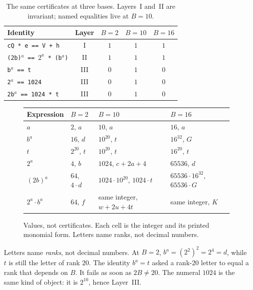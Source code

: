 \documentclass{article}
\theoremstyle{plain}
\theoremstyle{definition}
\theoremstyle{remark}
\begin{document}
\begin{table}[htbp]
\centering
\begin{tabular}{lcccc}
Identity & Layer & \(B=2\) & \(B=10\) & \(B=16\) \\
\hline
\texttt{cQ * e == V + h} & I & \(1\) & \(1\) & \(1\) \\
\texttt{(2b)$^a$ == $2^a$ * (b$^a$)} & II & \(1\) & \(1\) & \(1\) \\
\texttt{b$^a$ == t} & III & \(0\) & \(1\) & \(0\) \\
\texttt{2$^a$ == 1024} & III & \(0\) & \(1\) & \(0\) \\
\texttt{2b$^a$ == 1024 * t} & III & \(0\) & \(1\) & \(0\) \\
\end{tabular}
\caption{The same certificates at three bases. Layers~I and~II are
invariant; named equalities live at \(B=10\).}
\label{tab:certs}
\end{table}

\begin{figure}[htbp]
\centering
\begin{tabular}{llll}
Expression & \(B=2\) & \(B=10\) & \(B=16\) \\
\hline
\(a\) & \(2\), \(a\) & \(10\), \(a\) & \(16\), \(a\) \\
\(b^a\) & \(16\), \(d\) & \(10^{20}\), \(t\) & \(16^{32}\), \(G\) \\
\(t\) & \(2^{20}\), \(t\) & \(10^{20}\), \(t\) & \(16^{20}\), \(t\) \\
\(2^a\) & \(4\), \(b\) & \(1024\), \(c+2a+4\) & \(65536\), \(d\) \\
\((2b)^a\) & \(64\), \(4\cdot d\) & \(1024\cdot 10^{20}\), \(1024\cdot t\)
  & \(65536\cdot 16^{32}\), \(65536\cdot G\) \\
\(2^a\cdot b^a\) & \(64\), \(f\) & same integer, \(w+2u+4t\)
  & same integer, \(K\) \\
\end{tabular}
\caption{Values, not certificates. Each cell is the integer and its
printed monomial form. Letters name ranks, not decimal numbers.}
\label{fig:basechange}
\end{figure}

Letters name \emph{ranks}, not decimal numbers. At \(B=2\),
\(b^a = (2^2)^2 = 2^4 = d\), while \(t\) is still the letter of rank
\(20\). The identity \(b^a = t\) asked a rank-\(20\) letter to equal a
rank that depends on \(B\). It fails as soon as \(2B \ne 20\). The
numeral \(1024\) is the same kind of object: it is \(2^{10}\), hence
Layer~III.
\end{document}
